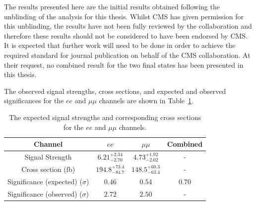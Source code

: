 
The results presented here are the initial results obtained following the unblinding of the analysis for this thesis.
Whilst CMS has given permission for this unblinding, the results have not been fully reviewed by the collaboration and therefore these results should not be considered to have been endorsed by CMS.
It is expected that further work will need to be done in order to achieve the required standard for journal publication on behalf of the CMS collaboration.
At their request, no combined result for the two final states has been presented in this thesis.

The observed signal strengths, cross sections, and expected and observed significances for the $ee$ and $\mu\mu$ channels are shown in Table~\ref{tab:shapetxs}.

\begin{table}[!h]
   \centering
   \caption{The expected signal strengths and corresponding cross sections for
   the $ee$ and $\mu\mu$ channels.}
   \begin{tabular}{cccc}
       \hline
       Channel & $ee$ & $\mu\mu$ & Combined \\
        \hline
       Signal Strength & $6.21_{-2.70}^{+2.34}$ & $4.73_{-2.02}^{+1.92}$ & - \\
       Cross section (fb) & $194.8_{-84.7}^{+73.4}$ & $148.5_{-63.4}^{+60.3}$ & - \\
       Significance (expected) ($\sigma$) & $0.46$ & $0.54$ & $0.70$\\
       Significance (observed) ($\sigma$) & $2.72$ & $2.50$ & - \\
    \end{tabular}
   \label{tab:shapetxs}
\end{table}
%


